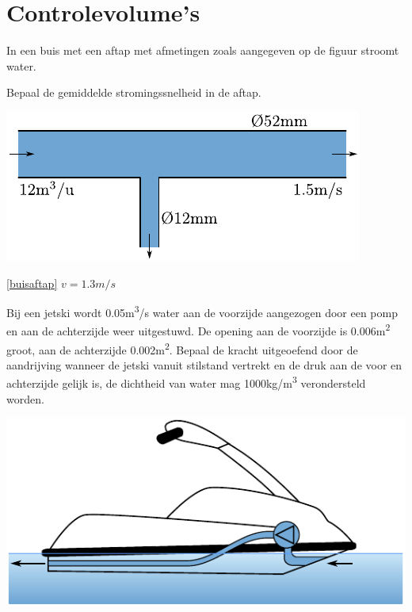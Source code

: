 \chapter{Controlevolume's}
\label{sec:Controlevolume's}
\begin{toepassing}
	\label{buisaftap}
In een buis met een aftap met afmetingen zoals aangegeven op de figuur stroomt water.
		
Bepaal de gemiddelde stromingssnelheid in de aftap.

	\centering
	\includegraphics{fig/behoudsvergelijkingen/buisaftap}
\end{toepassing}
\begin{antwoord}{\ref{buisaftap}}
	$v = 1.3\unit{m/s}$
\end{antwoord}
\begin{toepassing}
	\label{jetski}
Bij een jetski wordt 0.05\unit{m^3/s} water aan de voorzijde aangezogen door een pomp en aan de achterzijde weer uitgestuwd. De opening aan de voorzijde is 0.006\unit{m^2} groot, aan de achterzijde 0.002\unit{m^2}. Bepaal de kracht uitgeoefend door de aandrijving wanneer de jetski vanuit stilstand vertrekt en de druk aan de voor en achterzijde gelijk is, de dichtheid van water mag 1000\unit{kg/m^3} verondersteld worden.

	\centering
	\includegraphics{fig/behoudsvergelijkingen/jetski}
\end{toepassing}
